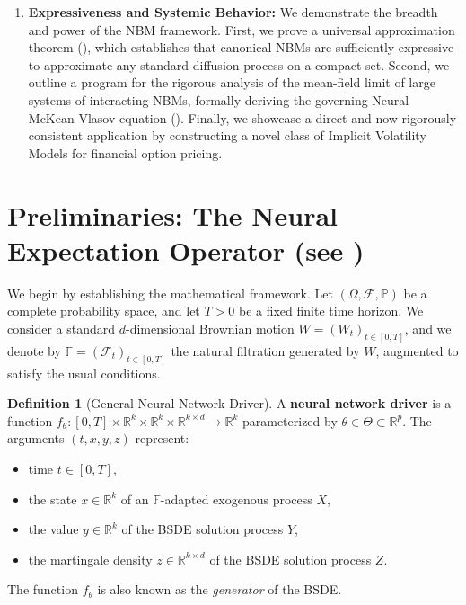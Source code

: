 \documentclass[qian]{imsart}
\newcommand{\R}{\mathbb{R}}
\newcommand{\Prob}{\mathbb{P}}
\newcommand{\Fcal}{\mathcal{F}}
\theoremstyle{plain}
\theoremstyle{definition}
\newtheorem{definition}[theorem]{Definition}
\begin{document}
\begin{enumerate}
    \item \textbf{Expressiveness and Systemic Behavior:} We demonstrate the breadth and power of the NBM framework. First, we prove a universal approximation theorem (), which establishes that canonical NBMs are sufficiently expressive to approximate any standard diffusion process on a compact set. Second, we outline a program for the rigorous analysis of the mean-field limit of large systems of interacting NBMs, formally deriving the governing Neural McKean-Vlasov equation (). Finally, we showcase a direct and now rigorously consistent application by constructing a novel class of Implicit Volatility Models for financial option pricing.
\end{enumerate}

\section{Preliminaries: The Neural Expectation Operator (see \cite{qi2025neuralexpectationoperators})}
\label{sec:prelim}

We begin by establishing the mathematical framework. Let $(\Omega, \Fcal, \Prob)$ be a complete probability space, and let $T > 0$ be a fixed finite time horizon. We consider a standard $d$-dimensional Brownian motion $W = (W_t)_{t \in [0,T]}$, and we denote by $\mathbb{F} = (\Fcal_t)_{t \in [0,T]}$ the natural filtration generated by $W$, augmented to satisfy the usual conditions.

\begin{definition}[General Neural Network Driver]
\label{def:driver}
A \textbf{neural network driver} is a function $f_\theta: [0,T] \times \R^k \times \R^k \times \R^{k \times d} \to \R^k$ parameterized by $\theta \in \Theta \subset \R^p$. The arguments $(t,x,y,z)$ represent:
\begin{itemize}[noitemsep, topsep=3pt]
    \item time $t \in [0,T]$,
    \item the state $x \in \R^k$ of an $\mathbb{F}$-adapted exogenous process $X$,
    \item the value $y \in \R^k$ of the BSDE solution process $Y$,
    \item the martingale density $z \in \R^{k \times d}$ of the BSDE solution process $Z$.
\end{itemize}
The function $f_\theta$ is also known as the \textit{generator} of the BSDE.
\end{definition}
\end{document}
